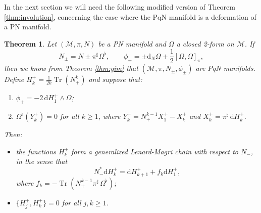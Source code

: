 \documentclass[12pt]{article}
\newtheorem{theorem}{Theorem}%
\def\d{{\mathrm d}}
\def\parpo#1#2{\{#1,#2\}}
\def\M{{\mathcal M}}
\def\Tr{\operatorname{Tr}}
\begin{document}
In the next section we will need the following modified version of %
Theorem \ref{thm:involution}, concerning the case where the PqN manifold is a deformation of a PN manifold.

\begin{theorem} 
\label{thm:involution2}
Let $(\M,\pi,N)$ be a PN manifold and $\Omega$ a closed 2-form on $\M$. If 
\begin{equation}
\label{N_pm}
N_{\pm}=N\pm\pi^\sharp\Omega^\flat,\qquad
\phi_\pm=\pm \d_N\Omega+\frac12[\Omega,\Omega]_\pi, 
\end{equation}
then we know from Theorem \ref{thm:gim} that $(\M,\pi,N_\pm,\phi_\pm)$ are PqN manifolds. Define $H_k^+=\frac1{2k}\Tr({N}_+^k)$ and suppose that:
\begin{enumerate}
\item[$(a')$] $\phi_+=-2\,\d H^+_1\wedge\Omega$; 
\item[$(b')$] $\Omega^\flat({Y_k^+})=0$ for all $k\ge 1$, where $Y_k^+=N_+^{k-1}X^+_1-X^+_k$ and $X^+_k=\pi^\sharp\,\d H^+_k$.
\end{enumerate}
Then:
\begin{itemize}
\item[i)] the functions $H_k^+$ form a generalized Lenard-Magri chain %
with respect to $N_-$, in the sense that
\begin{equation}
\label{gen-LM-chain}
N_-^* \d H_k^+ = \d H_{k+1}^+ + f_k \d H_1^+,
\end{equation}
where $f_k=-\Tr\left({N}_+^{k-1}\pi^\sharp\,\Omega^\flat\right)$;
\item[ii)] %
$\parpo{H^+_j}{H^+_k}=0$ for all $j,k\ge 1$.
\end{itemize}
\end{theorem}
\noindent
\end{document}
